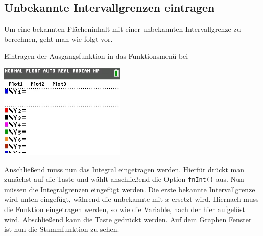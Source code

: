 \subsection{Unbekannte Intervallgrenzen eintragen}\label{sec:Unbekannte Intervallgrenze eintragen}
Um eine bekannten Flächeninhalt mit einer unbekannten Intervallgrenze zu berechnen, geht man wie folgt vor.
\begin{paracol}{2}
\begin{flushleft}
	Eintragen der Ausgangsfunktion in das Funktionsmenü bei 
\end{flushleft}	
\switchcolumn
\begin{flushright}
	\includegraphics[width=6cm]{Media/GRT/Visualisierung/unbekannte_intervallgrenze/unbekannte_intervallgrenze_1.png}

\end{flushright}
\end{paracol}
Anschließend muss nun das Integral eingetragen werden. Hierfür drückt man zunächst auf die Taste  und wählt anschließend die Option \texttt{fnInt()} aus. Nun müssen die Integralgrenzen eingefügt werden. Die erste bekannte Intervallgrenze wird unten eingefügt, während die unbekannte mit $x$ ersetzt wird. Hiernach muss die Funktion eingetragen werden, so wie die Variable, nach der hier aufgelöst wird. Abschließend kann die Taste  gedrückt werden. Auf dem Graphen Fenster ist nun die Stammfunktion zu sehen.

\pagebreak
